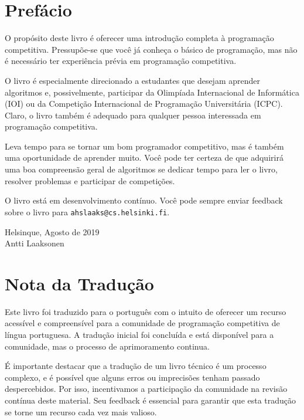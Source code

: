 \chapter*{Prefácio}

O propósito deste livro é oferecer uma introdução completa à programação competitiva. Pressupõe-se que você já conheça o básico de programação, mas não é necessário ter experiência prévia em programação competitiva.

O livro é especialmente direcionado a estudantes que desejam aprender algoritmos e, possivelmente, participar da Olimpíada Internacional de Informática (IOI) ou da Competição Internacional de Programação Universitária (ICPC). Claro, o livro também é adequado para qualquer pessoa interessada em programação competitiva.

Leva tempo para se tornar um bom programador competitivo, mas é também uma oportunidade de aprender muito. Você pode ter certeza de que adquirirá uma boa compreensão geral de algoritmos se dedicar tempo para ler o livro, resolver problemas e participar de competições.

O livro está em desenvolvimento contínuo. Você pode sempre enviar feedback sobre o livro para \texttt{ahslaaks@cs.helsinki.fi}.

\begin{flushright}
Helsinque, Agosto de 2019 \\
Antti Laaksonen
\end{flushright}

\chapter*{Nota da Tradução}

Este livro foi traduzido para o português com o intuito de oferecer um recurso acessível e compreensível para a comunidade de programação competitiva de língua portuguesa. A tradução inicial foi concluída e está disponível para a comunidade, mas o processo de aprimoramento continua.

É importante destacar que a tradução de um livro técnico é um processo complexo, e é possível que alguns erros ou imprecisões tenham passado despercebidos. Por isso, incentivamos a participação da comunidade na revisão contínua deste material. Seu feedback é essencial para garantir que esta tradução se torne um recurso cada vez mais valioso.


